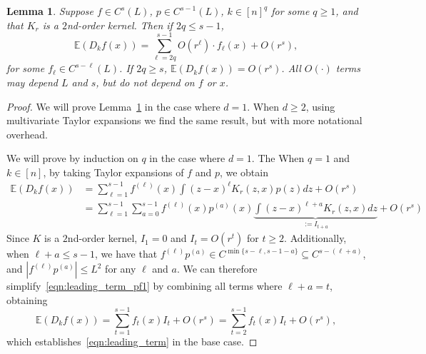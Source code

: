 \documentclass{article}
\newcommand{\abs}[1]{\left \lvert #1 \right \rvert}
\newcommand{\1}{\mathbf{1}}
\newcommand{\Ebb}{\mathbb{E}}
\theoremstyle{alden}
\theoremstyle{aldenthm}
\newtheorem{lemma}{Lemma}
\theoremstyle{definition}
\theoremstyle{remark}
\begin{document}
\begin{lemma}
	\label{lem:leading_term}
	Suppose $f \in C^s(L)$, $p \in C^{s-1}(L)$, $k \in [n]^q$ for some $q \geq 1$, and that $K_r$ is a $2$nd-order kernel. Then if $2q \leq s - 1$,
	\begin{equation}
	\label{eqn:leading_term}
	\Ebb(D_kf(x)) = \sum_{\ell = 2q}^{s - 1} O(r^{\ell}) \cdot f_{\ell}(x) + O(r^s),
	\end{equation}
	for some $f_{\ell} \in C^{s - \ell}(L)$. If $2q \geq s$, $\Ebb(D_kf(x)) = O(r^s)$.  All $O(\cdot)$ terms may depend $L$ and $s$, but do not depend on $f$ or $x$.
\end{lemma}
\begin{proof}
	We will prove Lemma~\ref{lem:leading_term} in the case where $d = 1$. When $d \geq 2$, using multivariate Taylor expansions we find the same result, but with more notational overhead. 
	
	We will prove by induction on $q$ in the case where $d = 1$. The When $q = 1$ and $k \in [n]$, by taking Taylor expansions of $f$ and $p$, we obtain
	\begin{align}
	\nonumber 
	\Ebb(D_kf(x)) & = \sum_{\ell = 1}^{s - 1} f^{(\ell)}(x) \int (z - x)^{\ell} K_r(z,x) p(z) dz + O(r^s) \\ 
	& = \sum_{\ell = 1}^{s - 1} \sum_{a = 0}^{s - 1} f^{(\ell)}(x) p^{(a)}(x) \underbrace{\int(z - x)^{\ell + a} K_r(z,x) dz}_{:=I_{t + a}} + O(r^s) \label{eqn:leading_term_pf1}
	\end{align}
	Since $K$ is a $2$nd-order kernel, $I_{1} = 0$ and $I_t = O(r^{t})$ for $t \geq 2$.  Additionally, when $\ell + a \leq s - 1$, we have that $f^{(\ell)}p^{(a)} \in C^{\min\{s - \ell, s - 1 - a\}} \subseteq C^{s - (\ell + a)}$, and $\abs{f^{(\ell)}p^{(a)}} \leq L^2$ for any $\ell$ and $a$. We can therefore simplify~\eqref{eqn:leading_term_pf1} by combining all terms where $\ell + a = t$, obtaining
	\begin{equation}
	\label{eqn:leading_term_pf2}
	\Ebb(D_kf(x)) = \sum_{t = 1}^{s - 1} f_t(x) I_t + O(r^s) = \sum_{t = 2}^{s - 1} f_t(x) I_t + O(r^s),
	\end{equation}
	which establishes~\eqref{eqn:leading_term} in the base case.
	

\end{proof}
\end{document}

